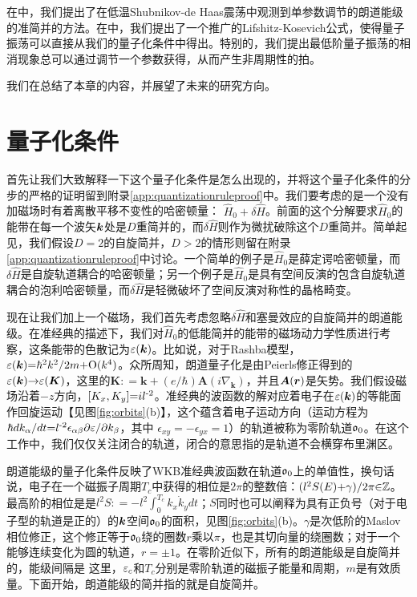在中，我们提出了在低温Shubnikov-de Haas震荡\cite{SdH}中观测到单参数调节的朗道能级的准简并的方法。在中，我们提出了一个推广的Lifshitz-Kosevich公式，使得量子振荡可以直接从我们的量子化条件中得出。特别的，我们提出最低阶量子振荡的相消现象总可以通过调节一个参数获得，从而产生非周期性的拍。

我们在总结了本章的内容，并展望了未来的研究方向。


\section{量子化条件\label{sec:qtznrules}}

首先让我们大致解释一下这个量子化条件是怎么出现的，并将这个量子化条件的分步的严格的证明留到附录\ref{app:quantizationruleproof}中。我们要考虑的是一个没有加磁场时有着离散平移不变性的哈密顿量： $\hat{H}_0{+}\delta \hat{H}$。前面的这个分解要求$\hat{H}_0$的能带在每一个波矢$\boldsymbol{k}$处是$D$重简并的，而$\delta \hat{H}$则作为微扰破除这个$D$重简并。简单起见，我们假设$D{=}2$的自旋简并，$D>2$的情形则留在附录\ref{app:quantizationruleproof}中讨论。一个简单的例子是$\hat{H}_0$是薛定谔哈密顿量，而$\delta \hat{H}$是自旋轨道耦合的哈密顿量；另一个例子是$\hat{H}_0$是具有空间反演的包含自旋轨道耦合的泡利哈密顿量，而$\delta \hat{H}$是轻微破坏了空间反演对称性的晶格畸变。

现在让我们加上一个磁场，我们首先考虑忽略$\delta \hat{H}$和塞曼效应的自旋简并的朗道能级。在准经典的描述下，我们对$\hat{H}_0$的低能简并的能带的磁场动力学性质进行考察，这条能带的色散记为$\varepsilon(\boldsymbol{k})$。比如说，对于Rashba模型，$\varepsilon(\boldsymbol{k}){=}\hbar^2 k^2/2m{+}\text{O}(k^4)$。众所周知，朗道量子化是由Peierls修正得到的$\varepsilon(\boldsymbol{k}){\rightarrow}\varepsilon(\boldsymbol{K})$\cite{peierls_substitution}，这里的$\boldsymbol{K}{:}{=}\boldsymbol{k}{+}(e/\hbar) \boldsymbol{A}(i\nabla_{\boldsymbol{k}})$，并且$\boldsymbol{A}(\boldsymbol{r})$是矢势。我们假设磁场沿着$-z$方向，$[K_x,K_y]{=}il^{\text{-}2}$。准经典的波函数的解对应着电子在$\varepsilon(\boldsymbol{k})$的等能面作回旋运动【见图\ref{fig:orbits}(b)】，这个蕴含着电子运动方向（运动方程为$ \hbar dk_{\alpha}/dt {=} l^{\text{-}2} \epsilon_{\alpha\beta}\partial \varepsilon/\partial k_{\beta} $，其中 $\epsilon_{xy}{=}{-}\epsilon_{yx}{=}1$）的轨道被称为零阶轨道$\mathfrak{o}_0$。在这个工作中，我们仅仅关注闭合的轨道，闭合的意思指的是轨道不会横穿布里渊区。

朗道能级的量子化条件反映了WKB准经典波函数在轨道$\mathfrak{o}_0$上的单值性\cite{berry_mount_review}，换句话说，电子在一个磁振子周期$T_c$中获得的相位是$2\pi$的整数倍：$(l^2S(E){+}\gamma)/2\pi{\in}\mathbb{Z}$。最高阶的相位是是$l^2S{:}{=}{-}l^2\int_{0}^{T_c} k_x \dot{k}_y dt$；$S$同时也可以阐释为具有正负号（对于电子型的轨道是正的）的$\boldsymbol{k}$空间$\mathfrak{o}_0$的面积，见图\ref{fig:orbits}(b)。$\gamma$是次低阶的Maslov相位修正\cite{keller1958}，这个修正等于$\mathfrak{o}_0$绕的圈数$r$乘以$\pi$，也是其切向量的绕圈数\cite{100p}；对于一个能够连续变化为圆的轨道，$r{=}{\pm} 1$。在零阶近似下，所有的朗道能级是自旋简并的，能级间隔是
这里，$\varepsilon_c$和$T_c$分别是零阶轨道的磁振子能量和周期，$m$是有效质量。下面开始，朗道能级的简并指的就是自旋简并。



